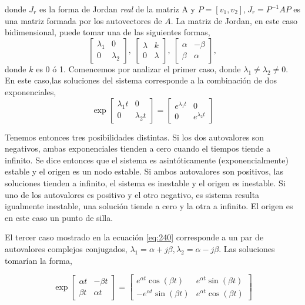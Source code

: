 donde  $J_r$ es la forma de Jordan \emph{real} de la matriz A y $P=[v_1,v_2]$,$\ J_r=P^{-1}AP$ es una matriz formada por los autovectores de $A$. La matriz de Jordan, en este caso bidimensional, puede tomar una de las siguientes formas,
\begin{equation}\label{eq:240}
\begin{bmatrix}
\lambda_1 & 0\\ 0 & \lambda_2
\end{bmatrix},\ \begin{bmatrix}
\lambda & k\\ 0 & \lambda
\end{bmatrix},\ \begin{bmatrix}
\alpha & -\beta\\ \beta & \alpha
\end{bmatrix},
\end{equation}
donde $k$ es 0 ó 1.
Comencemos por analizar el primer caso, donde $\lambda_1 \ne \lambda_2 \ne 0$. En este caso,las soluciones del sistema corresponde a la combinación de dos exponenciales,
\begin{equation}
\exp\begin{bmatrix}
\lambda_1t &0 \\
0& \lambda_2t
\end{bmatrix}=\begin{bmatrix}
e^{\lambda_1t} &0 \\
0& e^{\lambda_2t} 
\end{bmatrix}
\end{equation}



Tenemos entonces tres posibilidades distintas. Si los dos autovalores son negativos, ambas exponenciales tienden a cero cuando el tiempos tiende a infinito. Se dice entonces que el sistema es asintóticamente (exponencialmente) estable y el origen es un nodo estable. Si ambos autovalores son positivos, las soluciones tienden a infinito, el sistema es inestable y el origen es  inestable. Si uno de los autovalores es positivo y el otro negativo, es sistema resulta igualmente inestable, una solución tiende a cero y la otra a infinito. El origen es en este caso un punto de silla.

El tercer caso mostrado en la ecuación \ref{eq:240} corresponde a un par de autovalores complejos conjugados,
$\lambda_1 = \alpha + j \beta, \lambda_2 =\alpha -j\beta$.  Las soluciones tomarían la forma,

\begin{equation}
\exp\begin{bmatrix}
\alpha t & -\beta t\\ \beta t & \alpha t
\end{bmatrix} = 
\begin{bmatrix}
e^{\alpha t}\cos(\beta t) & e^{\alpha t}\sin(\beta t)\\
-e^{\alpha t}\sin(\beta t) & e^{\alpha t}\cos(\beta t)
\end{bmatrix}
\end{equation}

